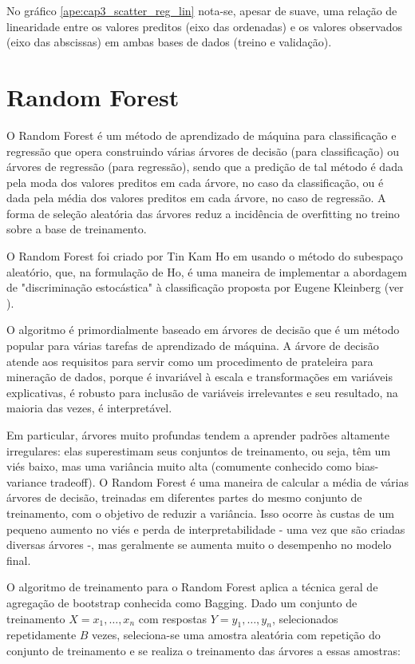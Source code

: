 No gráfico \ref{ape:cap3_scatter_reg_lin} nota-se, apesar de suave, uma relação de linearidade entre os valores preditos (eixo das ordenadas) e os valores observados (eixo das abscissas) em ambas bases de dados (treino e validação).

\section{Random Forest}
\label{sec:random_forest}

O Random Forest é um método de aprendizado de máquina para classificação e regressão que opera construindo várias árvores de decisão (para classificação) ou árvores de regressão (para regressão), sendo que a predição de tal método é dada pela moda dos valores preditos em cada árvore, no caso da classificação, ou é dada pela média dos valores preditos em cada árvore, no caso de regressão. A forma de seleção aleatória das árvores reduz a incidência de overfitting no treino sobre a base de treinamento.

O Random Forest foi criado por Tin Kam Ho em \citet{Ho1995} usando o método do subespaço aleatório, que, na formulação de Ho, é uma maneira de implementar a abordagem de "discriminação estocástica" à classificação proposta por Eugene Kleinberg (ver \citet{Kleinberg1990}).

O algoritmo é primordialmente baseado em árvores de decisão que é um método popular para várias tarefas de aprendizado de máquina. A árvore de decisão atende aos requisitos para servir como um procedimento de prateleira para mineração de dados, porque é invariável à escala e transformações em variáveis explicativas, é robusto para inclusão de variáveis irrelevantes e seu resultado, na maioria das vezes, é interpretável.

Em particular, árvores muito profundas tendem a aprender padrões altamente irregulares: elas superestimam seus conjuntos de treinamento, ou seja, têm um viés baixo, mas uma variância muito alta (comumente conhecido como bias-variance tradeoff). O Random Forest é uma maneira de calcular a média de várias árvores de decisão, treinadas em diferentes partes do mesmo conjunto de treinamento, com o objetivo de reduzir a variância. Isso ocorre às custas de um pequeno aumento no viés e perda de interpretabilidade - uma vez que são criadas diversas árvores -, mas geralmente se aumenta muito o desempenho no modelo final.

O algoritmo de treinamento para o Random Forest aplica a técnica geral de agregação de bootstrap conhecida como Bagging. Dado um conjunto de treinamento $ {\displaystyle X = x_{1},\ldots ,x_{n}} $ com respostas $ {\displaystyle Y = y_{1},\ldots ,y_{n}} $, selecionados repetidamente $ B $ vezes, seleciona-se uma amostra aleatória com repetição do conjunto de treinamento e se realiza o treinamento das árvores a essas amostras:

